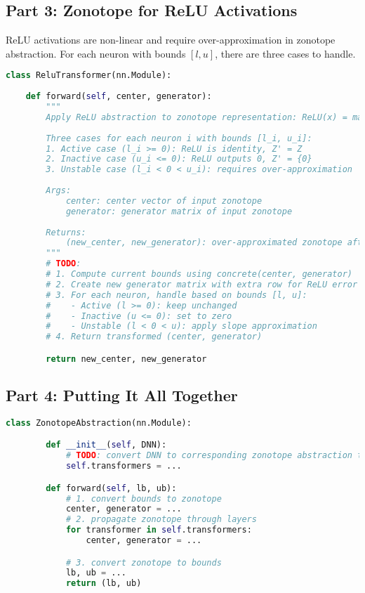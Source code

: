 \subsection{Part 3: Zonotope for ReLU Activations}

ReLU activations are non-linear and require over-approximation in zonotope abstraction. For each neuron with bounds $[l, u]$, there are three cases to handle.

\begin{lstlisting}[language=Python]
class ReluTransformer(nn.Module):
    
    def forward(self, center, generator):
        """
        Apply ReLU abstraction to zonotope representation: ReLU(x) = max(0, x)
        
        Three cases for each neuron i with bounds [l_i, u_i]:
        1. Active case (l_i >= 0): ReLU is identity, Z' = Z  
        2. Inactive case (u_i <= 0): ReLU outputs 0, Z' = {0}
        3. Unstable case (l_i < 0 < u_i): requires over-approximation
        
        Args:
            center: center vector of input zonotope
            generator: generator matrix of input zonotope  
            
        Returns:
            (new_center, new_generator): over-approximated zonotope after ReLU
        """
        # TODO:
        # 1. Compute current bounds using concrete(center, generator)
        # 2. Create new generator matrix with extra row for ReLU error
        # 3. For each neuron, handle based on bounds [l, u]:
        #    - Active (l >= 0): keep unchanged
        #    - Inactive (u <= 0): set to zero
        #    - Unstable (l < 0 < u): apply slope approximation
        # 4. Return transformed (center, generator)

        return new_center, new_generator

\end{lstlisting}

\subsection{Part 4: Putting It All Together}

\begin{lstlisting}[language=Python]
    class ZonotopeAbstraction(nn.Module):

        def __init__(self, DNN):
            # TODO: convert DNN to corresponding zonotope abstraction transformers
            self.transformers = ...

        def forward(self, lb, ub):
            # 1. convert bounds to zonotope
            center, generator = ...
            # 2. propagate zonotope through layers
            for transformer in self.transformers:
                center, generator = ...

            # 3. convert zonotope to bounds
            lb, ub = ...
            return (lb, ub)

\end{lstlisting}

